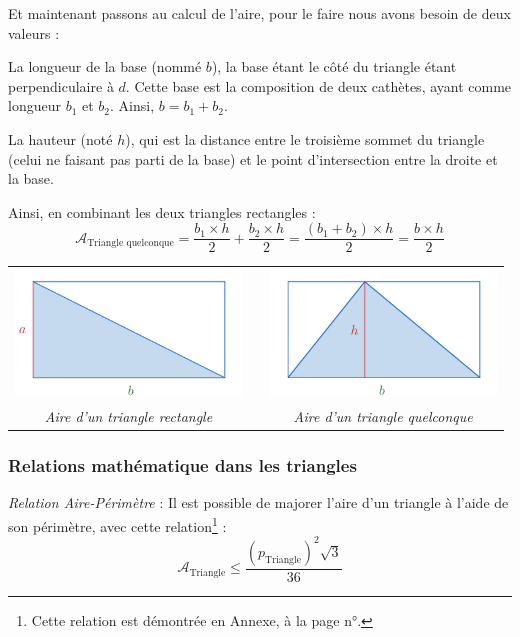 \documentclass[a4paper, twoside]{article}
\begin{document}
\medbreak

Et maintenant passons au calcul de l'aire,
pour le faire nous avons besoin de deux valeurs :

La longueur de la base (nommé $b$),
la base étant le côté du triangle étant perpendiculaire à $d$.
Cette base est la composition de deux cathètes, ayant comme longueur $b_1$ et $b_2$.
Ainsi, $b = b_1 + b_2$.

La hauteur (noté $h$),
qui est la distance entre le troisième sommet du triangle (celui ne faisant pas parti de la base) et le point d'intersection entre la droite et la base.

Ainsi, en combinant les deux triangles rectangles :
$$ \mathcal{A}_{\text{Triangle quelconque}} = \frac{b_1 \times h}{2} + \frac{b_2 \times h}{2} = \frac{(b_1+b_2) \times h}{2} = \frac{b \times h}{2} $$

\begin{center}
	\begin{tabular}{ccc}
		\includegraphics[width=6cm]{Image/Aire triangle rectangle.png} &               & \includegraphics[width=6cm]{Image/Aire triangle quelconque.png} \\
		\textit{Aire d'un triangle rectangle}                          & \phantom{cou} & \textit{Aire d'un triangle quelconque}                          \\
	\end{tabular}
\end{center}

\subsubsection{Relations mathématique dans les triangles}

\emph{Relation Aire-Périmètre} : Il est possible de majorer l'aire d'un
triangle à l'aide de son périmètre, avec cette relation\footnote{
	Cette relation est démontrée en Annexe, à la page n°\pageref{relation_aire_perim_triangle}.
} :
$$ \mathcal{A}_{\text{Triangle}} \leq \frac{(p_{\text{Triangle}})^2 \sqrt {3}} {36} $$
\end{document}
